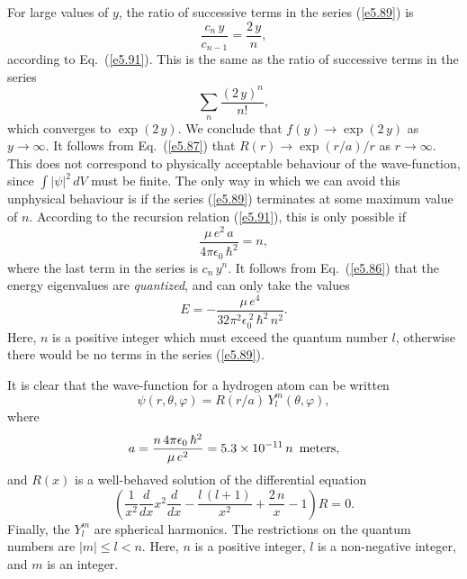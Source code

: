 For large values of $y$, the ratio of successive terms in the series
(\ref{e5.89}) is
\begin{equation}
\frac{c_n \,y}{c_{n-1}} = \frac{2\, y}{n},
\end{equation}
according to Eq.~(\ref{e5.91}). This is the same as the ratio of
successive terms in the series
\begin{equation}
\sum_n \frac{(2\,y)^n}{n!},
\end{equation}
which converges to $\exp(2\,y)$. We conclude that $f(y)\rightarrow \exp(2\,y)$
as $y\rightarrow \infty$. It follows from Eq.~(\ref{e5.87})  that $R(r) \rightarrow 
\exp(r/a) /r $ as $r\rightarrow \infty$. This does not correspond to
physically acceptable behaviour of the wave-function, since $\int |\psi|^2\,dV$
must be finite. The only way in which we can avoid this unphysical
behaviour is if the series (\ref{e5.89}) terminates at some maximum value of $n$.
According to the recursion relation (\ref{e5.91}), this is only possible
if
\begin{equation}
\frac{\mu\, e^2 \,a}{4\pi \epsilon_0\, \hbar^2} = n,
\end{equation}
where the last term in the series is $c_n\, y^n$. It follows from Eq.~(\ref{e5.86})
that the energy eigenvalues are {\em quantized}, and can only take the values
\begin{equation}\label{e5.95}
E = - \frac{\mu\, e^4}{32\pi^2\epsilon_0^{~2}\, \hbar^2\, n^2}.
\end{equation}
Here, $n$ is a positive integer which must exceed the quantum number $l$,
otherwise there would be no terms in the series (\ref{e5.89}).

It is clear that the wave-function for a hydrogen atom can be written
\begin{equation}
\psi(r, \theta, \varphi) = R(r/a)\, Y_l^m (\theta, \varphi),
\end{equation}
where
\begin{equation}
a =\frac{n\,4\pi \epsilon_0\,\hbar^2}{\mu \,e^2} = 5.3\times 10^{-11}\,n\,\,\,{\rm meters},
\end{equation}
and $R(x)$ is a well-behaved solution of the differential equation
\begin{equation}\label{e5.98}
\left(\frac{1}{x^2} \frac{d}{dx} x^2 \frac{d}{dx}-\frac{l\,(l+1)}{x^2}
+ \frac{2\,n}{x} - 1\right) R = 0.
\end{equation}
Finally, the $Y_l^m$ are spherical harmonics. The restrictions on the quantum numbers
are  $|m| \leq l< n$. Here, $n$ is a positive integer, $l$ is
a non-negative integer, and $m$ is an integer. 

